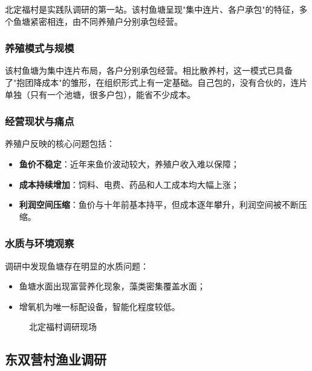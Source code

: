 \documentclass[12pt,a4paper]{article}
\begin{document}
北定福村是实践队调研的第一站。该村鱼塘呈现"集中连片、各户承包"的特征，多个鱼塘紧密相连，由不同养殖户分别承包经营。

\subsubsection{养殖模式与规模}

该村鱼塘为集中连片布局，各户分别承包经营。相比散养村，这一模式已具备了"抱团降成本"的雏形，在组织形式上有一定基础。自己包的，没有合伙的，连片单独（只有一个池塘，很多户包），能省不少成本。

\subsubsection{经营现状与痛点}

养殖户反映的核心问题包括：
\begin{itemize}[leftmargin=2em]
    \item \textbf{鱼价不稳定}：近年来鱼价波动较大，养殖户收入难以保障；
    \item \textbf{成本持续增加}：饲料、电费、药品和人工成本均大幅上涨；
    \item \textbf{利润空间压缩}：鱼价与十年前基本持平，但成本逐年攀升，利润空间被不断压缩。
\end{itemize}

\subsubsection{水质与环境观察}

调研中发现鱼塘存在明显的水质问题：
\begin{itemize}[leftmargin=2em]
    \item 鱼塘水面出现富营养化现象，藻类密集覆盖水面；
    \item 增氧机为唯一标配设备，智能化程度较低。
\end{itemize}

\begin{figure}[H]
\centering
{}
\caption{北定福村调研现场}
\end{figure}

\subsection{东双营村渔业调研}
\end{document}
